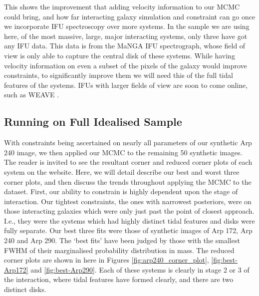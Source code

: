 This shows the improvement that adding velocity information to our MCMC could bring, and how far interacting galaxy simulation and constraint can go once we incorporate IFU spectroscopy over more systems. In the sample we are using here, of the most massive, large, major interacting systems, only three have got any IFU data. This data is from the MaNGA \citep{2015ApJ...798....7B} IFU spectrograph, whose field of view is only able to capture the central disk of these systems. While having velocity information on even a subset of the pixels of the galaxy would improve constraints, to significantly improve them we will need this of the full tidal features of the systems. IFUs with larger fields of view are soon to come online, such as WEAVE \citep{2014SPIE.9147E..0LD}. 

\subsection{Running on Full Idealised Sample}
\noindent With constraints being ascertained on nearly all parameters of our synthetic Arp 240 image, we then applied our MCMC to the remaining 50 synthetic images. The reader is invited to see the resultant corner and reduced corner plots of each system on the website. Here, we will detail describe our best and worst three corner plots, and then discuss the trends throughout applying the MCMC to the dataset. First, our ability to constrain is highly dependent upon the stage of interaction. Our tightest constraints, the ones with narrowest posteriors, were on those interacting galaxies which were only just past the point of closest approach. I.e., they were the systems which had highly distinct tidal features and disks were fully separate. Our best three fits were those of synthetic images of Arp 172, Arp 240 and Arp 290. The `best fits' have been judged by those with the smallest FWHM of their marginalised probability distribution in mass. The reduced corner plots are shown in here in Figures \ref{fig:arp240_corner_plot}, \ref{fig:best-Arp172} and \ref{fig:best-Arp290}. Each of these systems is clearly in stage 2 or 3 of the interaction, where tidal features have formed clearly, and there are two distinct disks.

